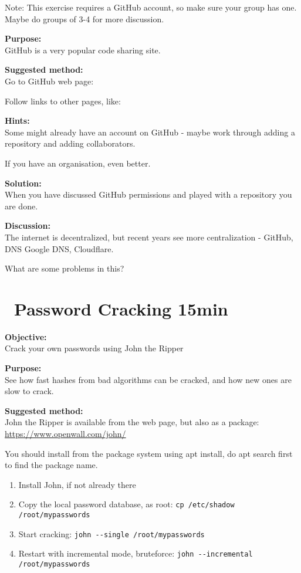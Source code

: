 \documentclass[a4paper,11pt,notitlepage]{report}
\begin{document}
Note: This exercise requires a GitHub account, so make sure your group has one. Maybe do groups of 3-4 for more discussion.

{\bf Purpose:}\\
GitHub is a very popular code sharing site.

{\bf Suggested method:}\\
Go to GitHub web page:\\

Follow links to other pages, like:\\


{\bf Hints:}\\
Some might already have an account on GitHub - maybe work through adding a repository and adding collaborators.

If you have an organisation, even better.

{\bf Solution:}\\
When you have discussed GitHub permissions and played with a repository you are done.

{\bf Discussion:}\\
The internet is decentralized, but recent years see more centralization - GitHub, DNS Google DNS, Cloudflare.

What are some problems in this?




\chapter{\faExclamationTriangle\ Password Cracking 15min}
\label{ex:pwcrack-101}

{\bf Objective:}\\
Crack your own passwords using John the Ripper


{\bf Purpose:}\\
See how fast hashes from bad algorithms can be cracked, and how new ones are slow to crack.

{\bf Suggested method:}\\
John the Ripper is available from the web page, but also as a package:\\
\url{https://www.openwall.com/john/}

You should install from the package system using apt install, do apt search first to find the package name.

\begin{enumerate}
\item Install John, if not already there
\item Copy the local password database, as root: \verb+cp /etc/shadow /root/mypasswords+
\item Start cracking: \verb+john --single /root/mypasswords+
\item Restart with incremental mode, bruteforce: \verb+john --incremental /root/mypasswords+
\end{enumerate}
\end{document}
